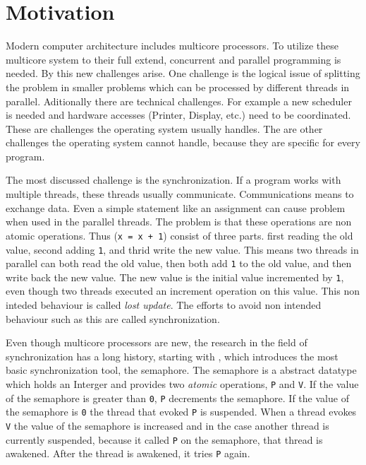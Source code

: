 
\chapter{Motivation} %

\label{Chapter0} %


\newcommand{\keyword}[1]{\textit{#1}}
\newcommand{\tabhead}[1]{\textbf{#1}}
\newcommand{\code}[1]{\texttt{#1}}
\newcommand{\file}[1]{\texttt{\bfseries#1}}
\newcommand{\option}[1]{\texttt{\itshape#1}}

Modern computer architecture includes multicore processors. To utilize these multicore system to their full extend, concurrent and parallel programming is needed.
By this new challenges arise. One challenge is the logical issue of splitting the problem in smaller problems which can be processed by different threads in parallel.
Aditionally there are technical challenges. For example a new scheduler is needed and hardware accesses (Printer, Display, etc.) need to be coordinated. These are challenges
the operating system usually handles. The are other challenges the operating system cannot handle, because they are specific for every program.

The most discussed challenge is the synchronization. If a program works with multiple threads, these threads usually communicate. Communications means to 
exchange data. Even a simple statement like an assignment can cause problem when used in the parallel threads. The problem is that these operations are
non atomic operations. Thus (\code{x = x + 1}) consist of three parts. first reading the old value, second adding \code{1}, and thrid write the new value.
This means two threads in parallel can both read the old value, then both add \code{1} to the old value, and then write back the new value. 
The new value is the initial value incremented by \code{1}, even though two threads executed an increment operation on this value. 
This non inteded behaviour is called \keyword{lost update}. The efforts to avoid non intended behaviour such as this are called synchronization.

Even though multicore processors are new, the research in the field of synchronization has a long history, starting with \parencite{semaphore}, which 
introduces the most basic synchronization tool, the semaphore. The semaphore is a abstract datatype which holds an Interger and provides two 
\keyword{atomic} operations, \code{P} and \code{V}. If the value of the semaphore is greater than \code{0}, \code{P} decrements the semaphore. If the value of 
the semaphore is \code{0} the thread that evoked \code{P} is suspended. When a thread evokes \code{V} the value of the semaphore is increased and
in the case another thread is currently suspended, because it called \code{P} on the semaphore, that thread is awakened. After the thread is
awakened, it tries \code{P} again. 

